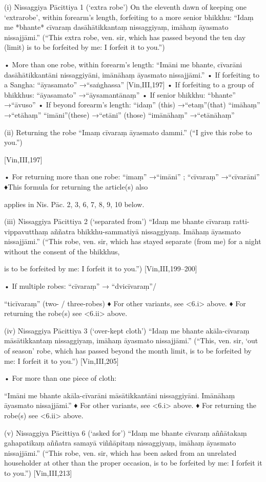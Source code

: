 (i) Nissaggiya Pācittiya 1 (‘extra robe’)
On the eleventh dawn of keeping one ‘extrarobe’, within forearm’s length, forfeiting to a
more senior bhikkhu:
“Idaṃ me *bhante* cīvaraṃ dasāhātikkantaṃ
nissaggiyaṃ, imāhaṃ āyasmato nissajjāmi.”
(“This extra robe, ven. sir, which has passed beyond the
ten day (limit) is to be forfeited by me: I forfeit it to you.”)

• More than one robe, within forearm’s
length:
“Imāni me bhante, cīvarāni dasāhātikkantāni
nissaggiyāni, imānāhaṃ āyasmato nissajjāmi.”
• If forfeiting to a Sangha:
“āyasamato” →“saṅghassa” [Vin,III,197]
• If forfeiting to a group of bhikkhus:
“āyasamato” →“āysamantānaṃ”
• If senior bhikkhu: “bhante” →“āvuso”
• If beyond forearm’s length:
“idaṃ” (this) →“etaṃ”(that)
“imāhaṃ” →“etāhaṃ”
“imāni”(these) →“etāni” (those)
“imānāhaṃ” →“etānāhaṃ”

(ii) Returning the robe
“Imaṃ cīvaraṃ āyasmato dammi.”
(“I give this robe to you.”)

[Vin,III,197]

• For returning more than one robe:
“imaṃ” →“imāni” ; “cīvaraṃ” →“cīvarāni”
♦This formula for returning the article(s) also

applies in Nis. Pāc. 2, 3, 6, 7, 8, 9, 10 below.

(iii) Nissaggiya Pācittiya 2 (‘separated from’)
“Idaṃ me bhante cīvaraṃ ratti-vippavutthaṃ
aññatra bhikkhu-sammatiyā nissaggiyaṃ.
Imāhaṃ āyasmato nissajjāmi.”
(“This robe, ven. sir, which has stayed separate (from
me) for a night without the consent of the bhikkhus,

is to be forfeited by me: I forfeit it to you.”)
[Vin,III,199–200]

• If multiple robes: “cīvaraṃ” → “dvicīvaraṃ”/

“ticīvaraṃ” (two- / three-robes)
♦ For other variants, see <6.i> above.
♦ For returning the robe(s) see <6.ii> above.

(iv) Nissaggiya Pācittiya 3 (‘over-kept cloth’)
“Idaṃ me bhante akāla-cīvaraṃ
māsātikkantaṃ nissaggiyaṃ,
imāhaṃ āyasmato nissajjāmi.”
(“This, ven. sir, ‘out of season’ robe, which has
passed beyond the month limit, is to be forfeited
by me: I forfeit it to you.”)
[Vin,III,205]

• For more than one piece of cloth:

“Imāni me bhante akāla-cīvarāni
māsātikkantāni nissaggiyāni.
Imānāhaṃ āyasmato nissajjāmi.”
♦ For other variants, see <6.i> above.
♦ For returning the robe(s) see <6.ii> above.

(v) Nissaggiya Pācittiya 6 (‘asked for’)
“Idaṃ me bhante cīvaraṃ aññātakaṃ
gahapatikaṃ aññatra samayā viññāpitaṃ
nissaggiyaṃ, imāhaṃ āyasmato nissajjāmi.”
(“This robe, ven. sir, which has been asked from an
unrelated householder at other than the proper
occasion, is to be forfeited by me: I forfeit it to you.”)
[Vin,III,213]

